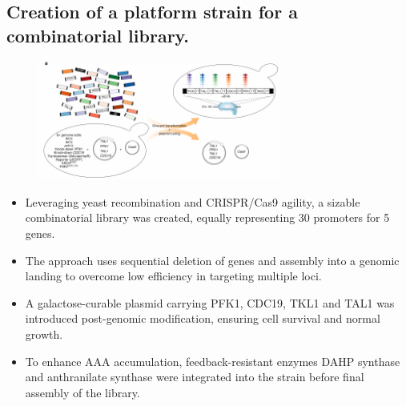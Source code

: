 \documentclass{beamer}
\begin{document}
\subsection{Creation of a platform strain for a combinatorial library.}
\begin{frame}{}
	    \begin{figure}
		\centering
		\includegraphics[width=8cm]{pic/图片5.pdf}
 	    \end{figure}  

    \begin{itemize} [<+-| alert@+>] %
        \item\scriptsize Leveraging yeast recombination and CRISPR/Cas9 agility, a sizable combinatorial library was created, equally representing 30 promoters for 5 genes.
        \item\scriptsize  The approach uses sequential deletion of genes and assembly into a genomic landing to overcome low efficiency in targeting multiple loci.
        \item\scriptsize  A galactose-curable plasmid carrying PFK1, CDC19, TKL1 and TAL1 was introduced post-genomic modification, ensuring cell survival and normal growth.
        \item\scriptsize  To enhance AAA accumulation, feedback-resistant enzymes DAHP synthase and anthranilate synthase were integrated into the strain before final assembly of the library.
        
    \end{itemize}  

      
\end{frame}
\end{document}
